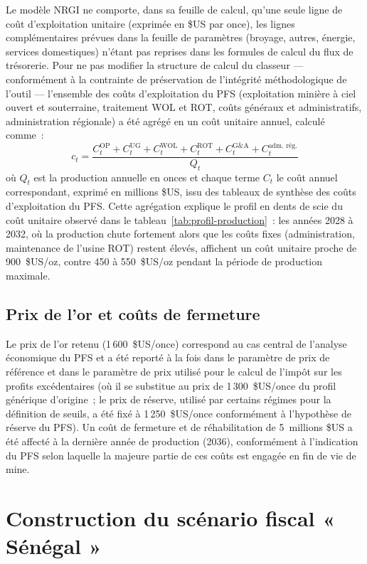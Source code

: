 Le modèle NRGI ne comporte, dans sa feuille de calcul, qu'une seule ligne de coût d'exploitation unitaire (exprimée en \$US par once), les lignes complémentaires prévues dans la feuille de paramètres (broyage, autres, énergie, services domestiques) n'étant pas reprises dans les formules de calcul du flux de trésorerie. Pour ne pas modifier la structure de calcul du classeur --- conformément à la contrainte de préservation de l'intégrité méthodologique de l'outil --- l'ensemble des coûts d'exploitation du PFS (exploitation minière à ciel ouvert et souterraine, traitement WOL et ROT, coûts généraux et administratifs, administration régionale) a été agrégé en un coût unitaire annuel, calculé comme~:
\begin{equation}
  c_t = \frac{C^{\text{OP}}_t + C^{\text{UG}}_t + C^{\text{WOL}}_t + C^{\text{ROT}}_t + C^{\text{G\&A}}_t + C^{\text{adm.~rég.}}_t}{Q_t}
\end{equation}
où $Q_t$ est la production annuelle en onces et chaque terme $C_t$ le coût annuel correspondant, exprimé en millions \$US, issu des tableaux de synthèse des coûts d'exploitation du PFS. Cette agrégation explique le profil en dents de scie du coût unitaire observé dans le tableau~\ref{tab:profil-production}~: les années 2028 à 2032, où la production chute fortement alors que les coûts fixes (administration, maintenance de l'usine ROT) restent élevés, affichent un coût unitaire proche de 900~\$US/oz, contre 450 à 550~\$US/oz pendant la période de production maximale.

\subsection{Prix de l'or et coûts de fermeture}

Le prix de l'or retenu (1\,600~\$US/once) correspond au cas central de l'analyse économique du PFS et a été reporté à la fois dans le paramètre de prix de référence et dans le paramètre de prix utilisé pour le calcul de l'impôt sur les profits excédentaires (où il se substitue au prix de 1\,300~\$US/once du profil générique d'origine~; le prix de réserve, utilisé par certains régimes pour la définition de seuils, a été fixé à 1\,250~\$US/once conformément à l'hypothèse de réserve du PFS). Un coût de fermeture et de réhabilitation de 5~millions \$US a été affecté à la dernière année de production (2036), conformément à l'indication du PFS selon laquelle la majeure partie de ces coûts est engagée en fin de vie de mine.

\section{Construction du scénario fiscal « Sénégal »}
\label{sec:scenario-senegal}


